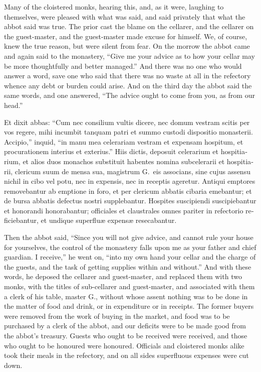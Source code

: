\documentclass[10pt]{book}
\begin{document}
\begin{paracol}{2}
\switchcolumn

Many of the cloistered monks, hearing this, and, as it were, laughing to themselves, were pleased with what was said, and said privately that what the abbot said was true. The prior cast the blame on the cellarer, and the cellarer on the guest-master, and the guest-master made excuse for himself. We, of course, knew the true reason, but were silent from fear. On the morrow the abbot came and again said to the monastery, ``Give me your advice as to how your cellar may be more thoughtfully and better managed.'' And there was no one who would answer a word, save one who said that there was no waste at all in the refectory whence any debt or burden could arise. And on the third day the abbot said the same words, and one answered, ``The advice ought to come from you, as from our head.''

\switchcolumn*

\begin{otherlanguage}{latin}
Et dixit abbas: ``Cum nec consilium vultis dicere, nec domum vestram scitis per vos regere, mihi incumbit tanquam patri et summo custodi dispositio monasterii. Accipio,'' inquid, ``in manu mea celerariam vestram et expensam hospitum, et procurationem interius et exterius.'' Hiis dictis, deposuit celerarium et hospitiarium, et alios duos monachos substituit habentes nomina subcelerarii et hospitiarii, clericum suum de mensa sua, magistrum G.\ eis associans, sine cujus assensu nichil in cibo vel potu, nec in expensis, nec in receptis ageretur. Antiqui emptores removebantur ab emptione in foro, et per clericum abbatis cibaria emebantur; et de bursa abbatis defectus nostri supplebantur. Hospites suscipiendi suscipiebantur et honorandi honorabantur; officiales et claustrales omnes pariter in refectorio reficiebantur, et undique superflu\ae{} expens\ae{} resecabantur.
\end{otherlanguage}

\switchcolumn

Then the abbot said, ``Since you will not give advice, and cannot rule your house for yourselves, the control of the monastery falls upon me as your father and chief guardian. I receive,'' he went on, ``into my own hand your cellar and the charge of the guests, and the task of getting supplies within and without.'' And with these words, he deposed the cellarer and guest-master, and replaced them with two monks, with the titles of sub-cellarer and guest-master, and associated with them a clerk of his table, master G., without whose assent nothing was to be done in the matter of food and drink, or in expenditure or in receipts. The former buyers were removed from the work of buying in the market, and food was to be purchased by a clerk of the abbot, and our deficits were to be made good from the abbot's treasury. Guests who ought to be received were received, and those who ought to be honoured were honoured. Officials and cloistered monks alike took their meals in the refectory, and on all sides superfluous expenses were cut down.


\end{paracol}
\end{document}
